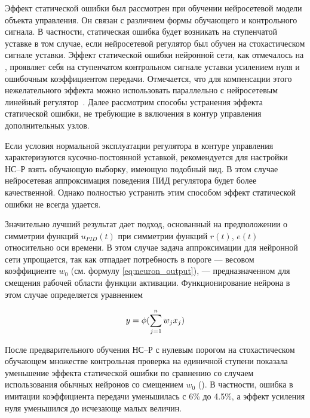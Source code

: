 Эффект статической ошибки был рассмотрен при обучении нейросетевой
модели объекта управления.  Он связан с различием формы обучающего и
контрольного сигнала.  В частности, статическая ошибка будет возникать
на ступенчатой уставке в том случае, если нейросетевой регулятор был
обучен на стохастическом сигнале уставки.  Эффект статической ошибки
нейронной сети, как отмечалось на , проявляет себя
на ступенчатом контрольном сигнале уставки усилением нуля и ошибочным
коэффициентом передачи.  Отмечается, что для компенсации этого
нежелательного эффекта можно использовать параллельно с нейросетевым
линейный регулятор~\cite{steck96}.  Далее рассмотрим способы
устранения эффекта статической ошибки, не требующие в включения в
контур управления дополнительных узлов.

Если условия нормальной эксплуатации регулятора в контуре управления
характеризуются кусочно-постоянной уставкой, рекомендуется для
настройки НС--Р взять обучающую выборку, имеющую подобный вид.  В этом
случае нейросетевая аппроксимация поведения ПИД регулятора будет более
качественной.  Однако полностью устранить этим способом эффект
статической ошибки не всегда удается.

Значительно лучший результат дает подход, основанный на предположении
о симметрии функций $u_{PID}(t)$ при симметрии функций $r(t)$, $e(t)$
относительно оси времени.  В этом случае задача аппроксимации для
нейронной сети упрощается, так как отпадает потребность в пороге ---
весовом коэффициенте $w_0$ (см. формулу \eqref{eq:neuron_output}), ---
предназначенном для смещения рабочей области функции активации.
Функционирование нейрона в этом случае определяется уравнением

\begin{equation}\label{eq:neuron_output_nobias}
y=\fa(\sum_{j=1}^nw_j x_j)
\end{equation}

После предварительного обучения НС--Р с нулевым порогом на
стохастическом обучающем множестве контрольная проверка на единичной
ступени показала уменьшение эффекта статической ошибки по сравнению со
случаем использования обычных нейронов со смещением $w_0$
().  В частности, ошибка в имитации
коэффициента передачи уменьшилась с 6\% до 4.5\%, а эффект усиления
нуля уменьшился до исчезающе малых величин.

